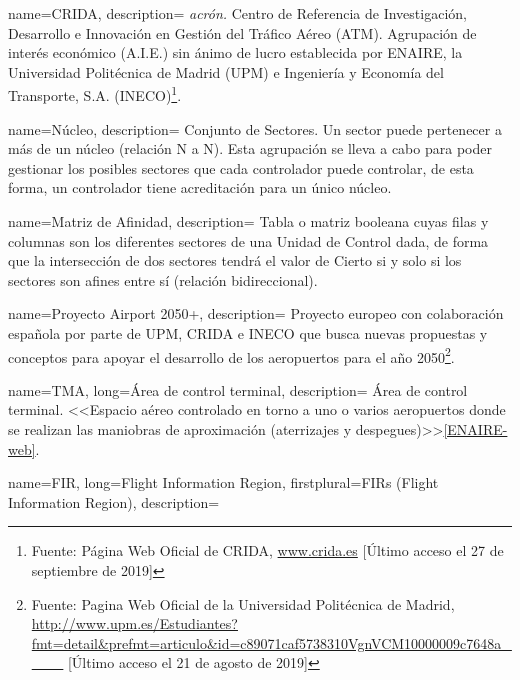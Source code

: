 {
    name={CRIDA},
    description=
    {   
        \textit{acrón.} Centro de Referencia de Investigación, Desarrollo e Innovación 
        en Gestión del Tráfico Aéreo (\gls{ATM}). Agrupación de interés económico (A.I.E.) sin ánimo de lucro 
        establecida por ENAIRE, la Universidad Politécnica de Madrid (UPM) e Ingeniería y Economía del Transporte, S.A. 
        (INECO)\footnote{Fuente: Página Web Oficial de CRIDA, \url{www.crida.es} [Último acceso el 27 de septiembre de 2019]}.
    }
}

{
    name={Núcleo},
    description=
    {   
        Conjunto de Sectores. Un sector puede pertenecer a más de un núcleo (relación N a N). Esta 
        agrupación se lleva a cabo para poder gestionar los posibles sectores que cada controlador puede controlar, de 
        esta 
        forma, un controlador tiene acreditación para un único núcleo.
    }
}

{
    name={Matriz de Afinidad},
    description=
    {   
        Tabla o matriz booleana cuyas filas y columnas son los diferentes sectores de 
        una Unidad de Control dada, de forma que la intersección de dos sectores tendrá el valor de Cierto si y solo si 
        los sectores son afines entre sí (relación bidireccional).
    }
}

{
    name={Proyecto Airport 2050+},
    description=
    {   
        Proyecto europeo con colaboración española por parte de UPM, CRIDA e INECO que busca nuevas propuestas y conceptos para apoyar el desarrollo de los aeropuertos para el año 2050\footnote{Fuente: Pagina Web Oficial de la Universidad Politécnica de Madrid, \url{http://www.upm.es/Estudiantes?fmt=detail&prefmt=articulo&id=c89071caf5738310VgnVCM10000009c7648a____} [Último acceso el 21 de agosto de 2019]}.
    }
}

{
    name={TMA},
    long={Área de control terminal},
    description=
    {   
        Área de control terminal. <<Espacio aéreo controlado en torno a uno o varios aeropuertos 
        donde se realizan las maniobras de aproximación (aterrizajes y despegues)>>\cref{ENAIRE-web}.
    }
}

{
    name={FIR},
    long={Flight Information Region},
    firstplural={FIRs (Flight Information Region)},
    description=
    {   
    }
}



